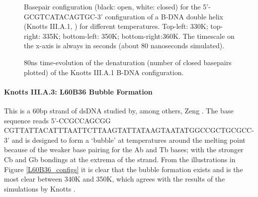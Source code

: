 \begin{figure}[h] \begin{minipage}{7cm}
 \end{minipage} \begin{minipage}{7cm}  \end{minipage}
\begin{minipage}{7cm}
 \end{minipage} \begin{minipage}{7cm}\end{minipage}\begin{center}
\caption{Basepair configuration (black: open, white: closed) for the 5'-GCGTCATACAGTGC-3' configuration of a B-DNA double helix (Knotts III.A.1, \cite{knotts2007coarse}) for different temperatures. Top-left: 330K; top-right: 335K; bottom-left: 350K; bottom-right:360K. The timescale on the x-axis is always in seconds (about 80 nanoseconds simulated).} \label{knotts1_configs}\end{center}
\end{figure}

\begin{figure}\begin{center}

\caption{80ns time-evolution of the denaturation (number of closed basepairs plotted) of the Knotts III.A.1 B-DNA configuration.}\label{knotts1_lines}\end{center}\end{figure}

\paragraph{Knotts III.A.3: L60B36 Bubble Formation} This is a 60bp strand of dsDNA studied by, among others, Zeng \etal \cite{zeng}. The base sequence reads 5'-CCGCCAGCGG CGTTATTACATTTAATTCTTAAGTATTATAAGTAATATGGCCGCTGCGCC-3' and is designed to form a `bubble' at temperatures around the melting point because of the weaker base pairing for the Ab and Tb bases; with the stronger Cb and Gb bondings at the extrema of the strand. From the illustrations in Figure \ref{L60B36_configs} it is clear that the bubble formation exists and is the most clear between 340K and 350K, which agrees with the results of the simulations by Knotts \etal \cite{knotts2007coarse}.

